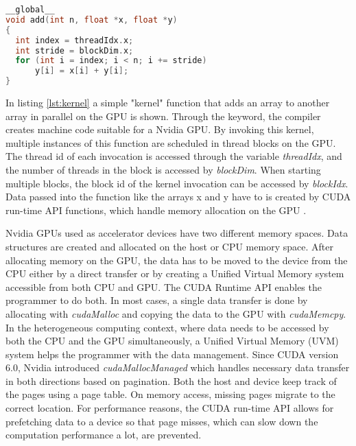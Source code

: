 \begin{lstlisting}[language=C++, caption=Simple CUDA kernel example \cite{EasyIntroductionCUDA2012}, label=lst:kernel]
__global__
void add(int n, float *x, float *y)
{
  int index = threadIdx.x;
  int stride = blockDim.x;
  for (int i = index; i < n; i += stride)
      y[i] = x[i] + y[i];
}
\end{lstlisting}
In listing \ref{lst:kernel} a simple "kernel" function that adds an array to another array in parallel on the GPU is shown. Through the \texttt{} keyword, the compiler creates machine code suitable for a Nvidia GPU. By invoking this kernel, multiple instances of this function are scheduled in thread blocks on the GPU. The thread id of each invocation is accessed through the variable \emph{threadIdx}, and the number of threads in the block is accessed by \emph{blockDim}. When starting multiple blocks, the block id of the kernel invocation can be accessed by \emph{blockIdx}.
Data passed into the function like the arrays x and y have to is created by CUDA run-time API functions, which handle memory allocation on the GPU \cite{MemoryManagement}.

Nvidia GPUs used as accelerator devices have two different memory spaces. Data structures are created and allocated on the host or CPU memory space. After allocating memory on the GPU, the data has to be moved to the device from the CPU either by a direct transfer or by creating a Unified Virtual Memory system accessible from both CPU and GPU. The CUDA Runtime API enables the programmer to do both. In most cases, a single data transfer is done by allocating with \emph{cudaMalloc} and copying the data to the GPU with \emph{cudaMemcpy}. In the heterogeneous computing context, where data needs to be accessed by both the CPU and the GPU simultaneously, a Unified Virtual Memory (UVM) system helps the programmer with the data management. Since CUDA version 6.0, Nvidia introduced \emph{cudaMallocManaged} which handles necessary data transfer in both directions based on pagination. \cite{gayatriComparingManagedMemory} Both the host and device keep track of the pages using a page table. On memory access, missing pages migrate to the correct location.
For performance reasons, the CUDA run-time API allows for prefetching data to a device so that page misses, which can slow down the computation performance a lot, are prevented.


